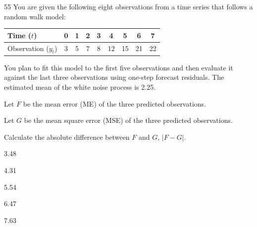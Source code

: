\begin{question}{55}
You are given the following eight observations from a time series that follows a random walk model:

\begin{center}
\begin{tabular}{|l|c|c|c|c|c|c|c|c|}
\hline
Time ($t$) & 0 & 1 & 2 & 3 & 4 & 5 & 6 & 7 \\ \hline
Observation ($y_t$) & 3 & 5 & 7 & 8 & 12 & 15 & 21 & 22 \\ \hline
\end{tabular}
\end{center}

You plan to fit this model to the first five observations and then evaluate it against the last three observations using one-step forecast residuals. The estimated mean of the white noise process is 2.25.

Let $F$ be the mean error (ME) of the three predicted observations.

Let $G$ be the mean square error (MSE) of the three predicted observations.

Calculate the absolute difference between $F$ and $G$, $|F - G|$.

\begin{choices}
\item 3.48
\item 4.31
\item 5.54
\item 6.47
\item 7.63
\end{choices}
\end{question}

